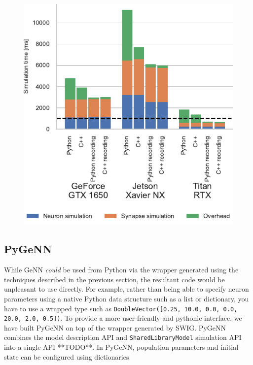 \documentclass[utf8]{frontiersSCNS} %
\begin{document}
\begin{figure}[h!]
    \begin{center}
        \includegraphics{figures/microcircuit_overheads.pdf}
    \end{center}
    \caption{}\label{fig:microcircuit_overheads}
\end{figure}

\subsection{PyGeNN}
While GeNN \emph{could} be used from Python via the wrapper generated using the techniques described in the previous section, the resultant code would be unpleasant to use directly.
For example, rather than being able to specify neuron parameters using a native Python data structure such as a list or dictionary, you have to use a wrapped type such as \lstinline{DoubleVector([0.25, 10.0, 0.0, 0.0, 20.0, 2.0, 0.5])}.
To provide a more user-friendly and pythonic interface, we have built PyGeNN on top of the wrapper generated by SWIG.
PyGeNN combines the model description API and \lstinline{SharedLibraryModel} simulation API into a single API **TODO**.
In PyGeNN, population parameters and initial state can be configured using dictionaries
\end{document}

